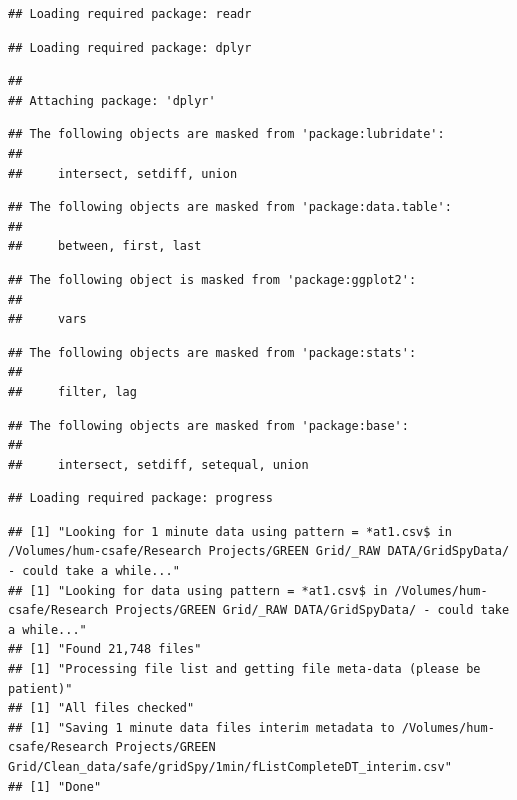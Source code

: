 \documentclass[]{article}
\begin{document}
\begin{verbatim}
## Loading required package: readr
\end{verbatim}

\begin{verbatim}
## Loading required package: dplyr
\end{verbatim}

\begin{verbatim}
## 
## Attaching package: 'dplyr'
\end{verbatim}

\begin{verbatim}
## The following objects are masked from 'package:lubridate':
## 
##     intersect, setdiff, union
\end{verbatim}

\begin{verbatim}
## The following objects are masked from 'package:data.table':
## 
##     between, first, last
\end{verbatim}

\begin{verbatim}
## The following object is masked from 'package:ggplot2':
## 
##     vars
\end{verbatim}

\begin{verbatim}
## The following objects are masked from 'package:stats':
## 
##     filter, lag
\end{verbatim}

\begin{verbatim}
## The following objects are masked from 'package:base':
## 
##     intersect, setdiff, setequal, union
\end{verbatim}

\begin{verbatim}
## Loading required package: progress
\end{verbatim}

\begin{verbatim}
## [1] "Looking for 1 minute data using pattern = *at1.csv$ in /Volumes/hum-csafe/Research Projects/GREEN Grid/_RAW DATA/GridSpyData/ - could take a while..."
## [1] "Looking for data using pattern = *at1.csv$ in /Volumes/hum-csafe/Research Projects/GREEN Grid/_RAW DATA/GridSpyData/ - could take a while..."
## [1] "Found 21,748 files"
## [1] "Processing file list and getting file meta-data (please be patient)"
## [1] "All files checked"
## [1] "Saving 1 minute data files interim metadata to /Volumes/hum-csafe/Research Projects/GREEN Grid/Clean_data/safe/gridSpy/1min/fListCompleteDT_interim.csv"
## [1] "Done"
\end{verbatim}
\end{document}
